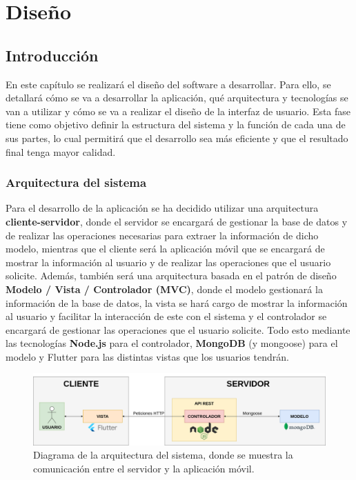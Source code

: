 \chapter{Diseño}

\section{Introducción}
En este capítulo se realizará el diseño del software a desarrollar. Para ello, se detallará cómo se va a desarrollar la aplicación, qué arquitectura y tecnologías se van a utilizar y cómo se va a realizar el diseño de la interfaz de usuario. 
Esta fase tiene como objetivo definir la estructura del sistema y la función de cada una de sus partes, lo cual permitirá que el desarrollo sea más eficiente y que el resultado final tenga mayor calidad.

\subsection{Arquitectura del sistema}
Para el desarrollo de la aplicación se ha decidido utilizar una arquitectura \textbf{cliente-servidor}, donde el servidor se encargará de gestionar la base de datos y de realizar las operaciones necesarias para extraer la información de dicho modelo, mientras que el cliente será 
la aplicación móvil que se encargará de mostrar la información al usuario y de realizar las operaciones que el usuario solicite. Además, también será una arquitectura basada en el patrón de diseño \textbf{Modelo / Vista / Controlador (MVC)}, donde el modelo gestionará la información
de la base de datos, la vista se hará cargo de mostrar la información al usuario y facilitar la interacción de este con el sistema y el controlador se encargará de gestionar las operaciones que el usuario solicite. Todo esto mediante las tecnologías \textbf{Node.js} para el controlador,  \textbf{MongoDB} (y mongoose) para
el modelo y Flutter para las distintas vistas que los usuarios tendrán. 

\begin{figure}[H]
    \centering
    \centerline{\includegraphics[width=\textwidth]{imagenes/c6/arch.png}}
    \caption{Diagrama de la arquitectura del sistema, donde se muestra la comunicación entre el servidor y la aplicación móvil.}
    \label{fig:diagramadearquitectura}    
\end{figure}

